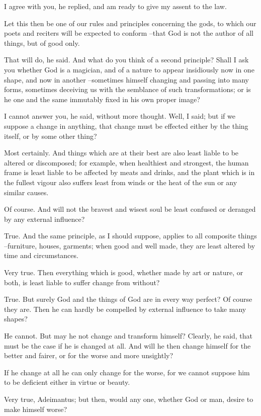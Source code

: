 I agree with you, he replied, and am ready to give my assent to the law.

Let this then be one of our rules and principles concerning the gods, to which our poets and reciters will be expected to conform --that God is not the author of all things, but of good only.

That will do, he said.
And what do you think of a second principle? Shall I ask you whether God is a magician, and of a nature to appear insidiously now in one shape, and now in another --sometimes himself changing and passing into many forms, sometimes deceiving us with the semblance of such transformations; or is he one and the same immutably fixed in his own proper image?

I cannot answer you, he said, without more thought.
Well, I said; but if we suppose a change in anything, that change must be effected either by the thing itself, or by some other thing?

Most certainly.
And things which are at their best are also least liable to be altered or discomposed; for example, when healthiest and strongest, the human frame is least liable to be affected by meats and drinks, and the plant which is in the fullest vigour also suffers least from winds or the heat of the sun or any similar causes.

Of course.
And will not the bravest and wisest soul be least confused or deranged by any external influence?

True.
And the same principle, as I should suppose, applies to all composite things --furniture, houses, garments; when good and well made, they are least altered by time and circumstances.

Very true.
Then everything which is good, whether made by art or nature, or both, is least liable to suffer change from without?

True.
But surely God and the things of God are in every way perfect?
Of course they are.
Then he can hardly be compelled by external influence to take many shapes?

He cannot.
But may he not change and transform himself?
Clearly, he said, that must be the case if he is changed at all.
And will he then change himself for the better and fairer, or for the worse and more unsightly?

If he change at all he can only change for the worse, for we cannot suppose him to be deficient either in virtue or beauty.

Very true, Adeimantus; but then, would any one, whether God or man, desire to make himself worse?

